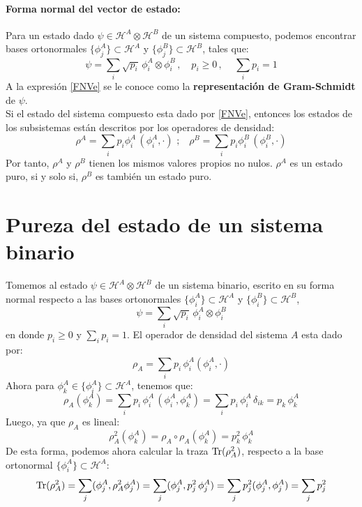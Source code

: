 \documentclass[12pt]{book}
\numberwithin{equation}{chapter}
\def\H{\mathcal{H}}
\def\pr{\otimes}
\def\Tr{\hbox{Tr}}
\begin{document}
\paragraph{Forma normal del vector de estado:} 
Para un estado dado $\psi \in \H^{A} \pr \H^{B}$ de un sistema compuesto, podemos encontrar bases ortonormales $ \{ \phi_{j}^{A} \}\subset \H^{A} $ y $ \{ \phi_{j}^{B} \} \subset \H^{B} $, tales que:
\begin{equation}\label{FNVe}
\psi= \sum_{i} \sqrt{p_{i}} \, \phi_{i}^{A} \pr \phi_{i}^{B} \,,\,\,\,\,\,\, p_{i} \geq 0 \,,\,\,\,\,\,\,\, \sum_{i} p_{i}=1
\end{equation}
A la expresi\'on \eqref{FNVe} se le conoce como la {\bf representaci\'on de Gram-Schmidt} de $\psi$. \\
Si el estado del sistema compuesto esta dado por \eqref{FNVe}, entonces los estados de los subsistemas est\'an descritos por los operadores de densidad:
\begin{equation}\label{rho-AB}
\rho^{A}= \sum_{i} p_{i} \phi_{i}^{A} \, ( \phi_{i}^{A},\cdot) \,\,;\,\,\,\,\, \rho^{B}= \sum_{i} p_{i} \phi_{i}^{B} \, ( \phi_{i}^{B},\cdot) 
\end{equation}
Por tanto, $\rho^{A}$ y $\rho^{B}$ tienen los mismos valores propios no nulos. $\rho^{A}$ es un estado puro, si y solo si, $\rho^{B}$ es tambi\'en un estado puro.

\rightline{$\dag$}
\vspace{5 mm}

\section{Pureza del estado de un sistema binario}
Tomemos al estado $\psi \in \H^{A} \pr \H^{B}$ de un sistema binario, escrito en su forma normal respecto a las bases ortonormales $ \{ \phi_{i}^{A} \} \subset \H^{A} $ y $ \{ \phi_{i}^{B} \} \subset \H^{B} $,
$$ \psi= \sum_{i} \sqrt{p_{i}} \, \phi_{i}^{A} \pr \phi_{i}^{B} $$
en donde $p_{i}\geq 0$ y $\sum_{i} p_{i}=1 $. El operador de densidad del sistema $A$ esta dado por: 
$$\rho_{A} = \sum_{i} p_{i}\, \phi_{i}^{A} ( \phi_{i}^{A}, \cdot ) $$
Ahora para $ \phi_{k}^{A} \in \{ \phi_{i}^{A} \} \subset \H^{A}$, tenemos que:
\begin{equation}
\rho_{A}(\phi_{k}^{A}) = \sum_{i} p_{i}\, \phi_{i}^{A} \, ( \phi_{i}^{A},\phi_{k}^{A} ) = \sum_{i} p_{i}\, \phi_{i}^{A} \, \delta_{ik} = p_{k}\, \phi_{k}^{A}
\end{equation}
Luego, ya que $\rho_{A}$ es lineal:
\begin{equation}
\rho_{A}^{2} (\phi_{k}^{A})= \rho_{A} \circ \rho_{A} (\phi_{k}^{A}) = p_{k}^{2}\, \phi_{k}^{A}
\end{equation}
De esta forma, podemos ahora calcular la traza $\Tr ( \rho_{A}^{2} )$, respecto a la base ortonormal $ \{ \phi_{i}^{A} \} \subset \H^{A} $:
\begin{equation}
\Tr ( \rho_{A}^{2} )= \sum_{j} ( \phi_{j}^{A} , \rho_{A}^{2} \phi_{j}^{A} )= \sum_{j} ( \phi_{j}^{A}, p_{j}^{2}\, \phi_{j}^{A} )= \sum_{j} p_{j}^{2} ( \phi_{j}^{A},\phi_{j}^{A} )= \sum_{j} p_{j}^{2} 
\end{equation}
\end{document}

